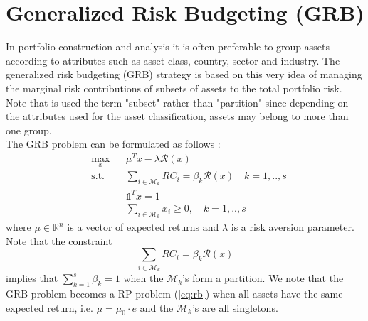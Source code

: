 \section{Generalized Risk Budgeting (GRB)}
In portfolio construction and analysis it is often preferable to group assets according to attributes such as asset class, country, sector and industry. The generalized risk budgeting (GRB) strategy is based on this very idea of managing the marginal risk contributions of subsets of assets to the total portfolio risk. Note that is used the term "subset" rather than "partition" since depending on the attributes used for the asset classification, assets may belong to more than one group.\\
The GRB problem can be formulated as follows \cite{sdp}:
\begin{equation}\label{eq:grb}
\begin{aligned}
& \underset{x}{\text{max}}
&& \mu^Tx - \lambda\mathcal{R}(x)\\
& \text{s.t.}
&&\sum_{i \in \mathcal{M}_k} RC_i = \beta_k \mathcal{R}(x) \quad k=1,..,s\\
&&&\mathds{1}^T x = 1\\
&&&\sum_{i \in \mathcal{M}_k} x_i \geq 0, \quad k=1,..,s
\end{aligned}
\end{equation}
where $\mu \in \mathbb{R}^n$ is a vector of expected returns and $\lambda$ is a risk aversion parameter. Note that the constraint
\begin{equation}
\sum_{i \in \mathcal{M}_k} RC_i = \beta_k \mathcal{R}(x)
\end{equation}
implies that $\sum_{k=1}^s \beta_k =1$ when the $\mathcal{M}_k$'s form a partition. We note that the GRB problem becomes a RP problem (\ref{eq:rb}) when all assets have the same expected return, i.e. $\mu = \mu_0 \cdot e$ and the $\mathcal{M}_k$'s are all singletons.